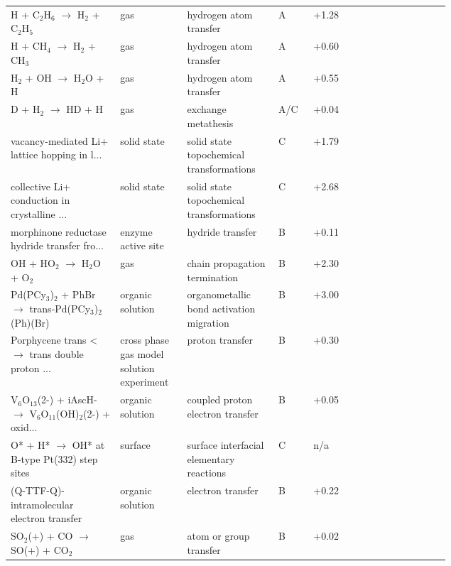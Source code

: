 \begin{table}[htbp]
\begin{tabular}{@{}p{0.205\linewidth}p{0.085\linewidth}p{0.125\linewidth}p{0.05\linewidth}p{0.12\linewidth}p{0.135\linewidth}@{}}
H + C$_2$H$_6$ $\to$ H$_2$ + C$_2$H$_5$ & gas & hydrogen atom transfer & A & +1.28 & \citep{ba_laude2018,ba_ledevillermaux1978nist} \\
H + CH$_4$ $\to$ H$_2$ + CH$_3$ & gas & hydrogen atom transfer & A & +0.60 & \citep{ba_beyer2016,ba_burgessmanion2021nist} \\
H$_2$ + OH $\to$ H$_2$O + H & gas & hydrogen atom transfer & A & +0.55 & \citep{ba_meisnerkastner2016h2oh,ba_orkin2006h2oh} \\
D + H$_2$ $\to$ HD + H & gas & exchange metathesis & A/C & +0.04 & \citep{ba_hankel2006h3pes,ba_westenbergdehaas1967viamielke} \\
vacancy-mediated Li+ lattice hopping in l... & solid state & solid state topochemical transformations & C & +1.79 & \citep{ba_zhou2023lico2fpmd,ba_sugiyama2009lico2musr} \\
collective Li+ conduction in crystalline ... & solid state & solid state topochemical transformations & C & +2.68 & \citep{ba_guo2022lpsaimd,ba_lpshistoricalexperimentaltable} \\
morphinone reductase hydride transfer fro... & enzyme active site & hydride transfer & B & +0.11 & \citep{ba_delgado2017mrqmmm,ba_delgado2017mrexperiment} \\
OH + HO$_2$ $\to$ H$_2$O + O$_2$ & gas & chain propagation termination & B & +2.30 & \citep{ba_speak2023ohho2,ba_chen2024ohho2} \\
Pd(PCy$_3$)$_2$ + PhBr $\to$ trans-Pd(PCy$_3$)$_2$(Ph)(Br) & organic solution & organometallic bond activation migration & B & +3.00 & \citep{ba_mcmullin2014oxidativeaddition,ba_barrioslanderos2009oxidativeaddition} \\
Porphycene trans <$\to$ trans double proton ... & cross phase gas model solution experiment & proton transfer & B & +0.30 & \citep{ba_litman2019porphycene,ba_ciacka2016porphyceneexperiment} \\
V$_6$O$_{13}$(2-) + iAscH- $\to$ V$_6$O$_{11}$(OH)$_2$(2-) + oxid... & organic solution & coupled proton electron transfer & B & +0.05 & \citep{ba_fertigmatson2023pcet} \\
O* + H* $\to$ OH* at B-type Pt(332) step sites & surface & surface interfacial elementary reactions & C & n/a & \citep{ba_nitz2025pt332} \\
(Q-TTF-Q)- intramolecular electron transfer & organic solution & electron transfer & B & +0.22 & \citep{ba_koczorbenda2023et,ba_gautier2003qttfexperiment} \\
SO$_2$(+) + CO $\to$ SO(+) + CO$_2$ & gas & atom or group transfer & B & +0.02 & \citep{ba_catone2019oat,ba_fehsenfeldferguson1973oat} \\

\end{tabular}
\end{table}
